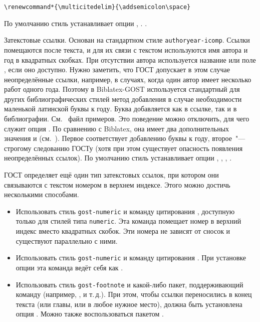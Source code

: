 \documentclass[10pt,a4paper,headings=small,numbers=enddot]{ltxdockit}[2011/03/25]
\newcommand*{\biblatex}{Biblatex\xspace}
\newcommand*{\biblatexgost}{\biblatex-GOST\xspace}
\newcommand*{\bibsty}{\texttt}
\begin{document}
\begin{marglist}
\begin{lstlisting}[style=latex]
\renewcommand*{\multicitedelim}{\addsemicolon\space}
\end{lstlisting}

По умолчанию стиль устанавливает опции , .
.

\item[gost-authoryear]
Затекстовые ссылки. Основан на стандартном 
стиле \bibsty{authoryear-icomp}. Ссылки помещаются после текста, и для их связи 
с текстом используются имя автора и год в квадратных скобках. При отсутствии автора
используется название или поле , если оно доступно. Нужно заметить, что ГОСТ 
допускает в этом случае неопределённые ссылки, например, в случаях, когда один автор имеет несколько 
работ одного года. Поэтому в \biblatexgost используется стандартный для других библиографических 
стилей 
метод добавления в случае необходимости маленькой латинской буквы к году. Буква добавляется как в 
ссылке, так и в библиографии. См.~ файл примеров. Это поведение можно отключить, для чего служит опция 
.
По сравнению с \biblatex, она имеет два дополнительных значения  и 
 (см.~). Первое соответствует добавлению буквы к году, 
второе~"--- строгому 
следованию ГОСТу (хотя при этом существует опасность появления неопределённых ссылок).
По умолчанию стиль устанавливает опции , 
,
,
. 

\end{marglist}

ГОСТ определяет ещё один тип затекстовых ссылок, при котором они 
связываются с текстом номером в верхнем индексе. Этого можно достичь несколькими способами. 

\begin{itemize}
\item Использовать стиль \bibsty{gost-numeric} и команду цитирования  
, доступную только для стилей типа \bibsty{numeric}. Эта команда
помещает номер в верхний индекс вместо квадратных скобок. Эти номера не зависят от 
сносок  и существуют параллельно с ними.
\item Использовать стиль \bibsty{gost-numeric} и команду цитирования
. При установке опции  эта команда ведёт себя 
как .
\item Использовать стиль \bibsty{gost-footnote} и какой-либо пакет, поддерживающий команду  (например, ,  и т.\,д.). 
При этом, чтобы ссылки переносились в конец текста (или главы, или в любое 
нужное место), должна быть установлена
опция . Можно также воспользоваться 
пакетом .
\end{itemize}
\end{document}
